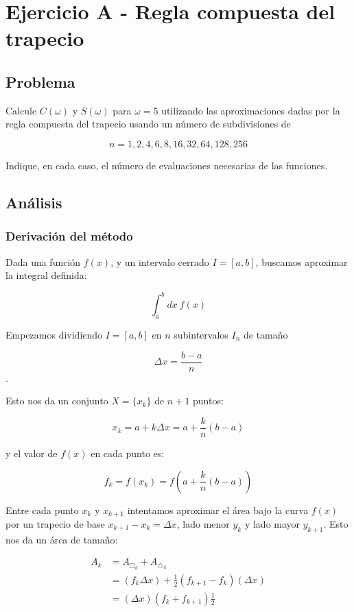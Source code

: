 \section{Ejercicio A - Regla compuesta del trapecio}

\subsection{Problema}

Calcule $C(\omega)$ y $S(\omega)$ para $\omega = 5$ utilizando las aproximaciones dadas por la regla
compuesta del trapecio usando un número de subdivisiones de

$$
n = 1, 2, 4, 6, 8, 16, 32, 64, 128, 256
$$

Indique, en cada caso, el número de evaluaciones necesarias de las funciones.

\subsection{Análisis}

\subsubsection{Derivación del método}

Dada una función $f(x)$, y un intervalo cerrado $I = [a, b]$, buscamos aproximar la integral definida: 

$$\int_{a}^{b} dx ~ f(x) $$


Empezamos dividiendo $I = [a, b]$ en $n$ subintervalos $I_n$ de tamaño 

$$
\Delta x = \frac{b - a} {n}
$$.

Esto nos da un conjunto $ X = \{ x_k \}$ de $n + 1$ puntos: 

$$
x_k = a + k \Delta x  = a + \frac{ k}{n}(b-a)
$$

y el valor de $f(x)$ en cada punto es:

$$
f_k = f(x_k) = f(a + \frac{ k}{n}(b-a) )
$$


Entre cada punto $x_k$ y $x_{k+1}$ intentamos aproximar el área bajo la curva $f(x)$ por un trapecio de base $x_{k+1} - x_k = \Delta x$, lado menor $y_k$ y lado mayor $y_{k+1}$. Esto nos da un área de tamaño:

\begin{align*}
	A_k 
	&= A_{\Box_k} + A_{\triangle_k} \\
	&= (f_k \Delta x ) + \frac{1}{2}(f_{k+1}-f_k)(\Delta x) \\
	&= (\Delta x)( f_k + f_{k+1} )\frac{1}{2}
\end{align*}

